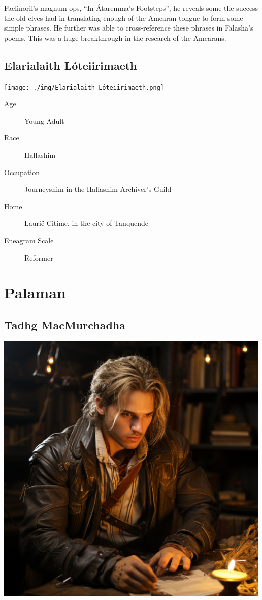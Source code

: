 \documentclass[11pt]{article}
\begin{document}
Faelinoril's magnum ops, ``In Átaremma's Footsteps'', he reveals some the success the old elves had in translating enough of the Amearan tongue to form some simple phrases. He further was able to cross-reference these phrases in Falasha's poems. This was a huge breakthrough in the research of the Amearans.
\subsection*{Elarialaith Lóteiirimaeth}
\label{sec:orgab78807}

\begin{center}
\texttt{[image: ./img/Elarialaith\_Lóteiirimaeth.png]}
\end{center}

\begin{description}
\item[{Age}] Young Adult
\item[{Race}] Hallashim
\item[{Occupation}] Journeyshim in the Hallashim Archiver's Guild
\item[{Home}] Laurië Citime, in the city of Tanquende
\item[{Eneagram Scale}] Reformer
\end{description}

\section*{Palaman}
\label{sec:org2de3407}
\subsection*{Tadhg MacMurchadha}
\label{sec:org55bc645}

\begin{center}
\includegraphics[width=500px]{./img/Tadhg_MacMurchadha.png}
\end{center}
\end{document}
